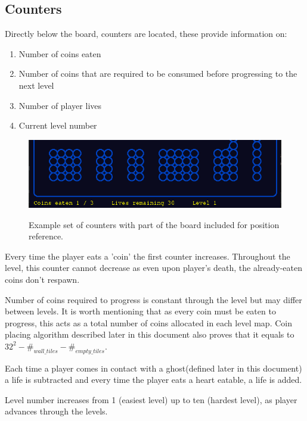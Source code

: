 \documentclass[11pt,a4paper]{report}
\newenvironment{img}{
	\begin{center}
		\begin{figure}
			\begin{center}
			
}{
	\end{center}
		\end{figure}
			\end{center}
}
\begin{document}
			\subsection{Counters}
				Directly below the board, counters are located, these provide information on:
				\begin{enumerate}
					\item
						Number of coins eaten
					\item
						Number of coins that are required to be consumed before progressing to the next level
					\item
						Number of player lives
					\item
						Current level number
				\end{enumerate}
				\begin{img}
					\includegraphics[width=350pt]{images/counter_example}\\
					\caption{Example set of counters with part of the board included for position reference.}
				\end{img}
				Every time the player eats a 'coin' the first counter increases. Throughout the level, this counter cannot decrease as even upon player's death, the already-eaten coins don't respawn.
				
				Number of coins required to progress is constant through the level but may differ between levels. It is worth mentioning that as every coin must be eaten to progress, this acts as a total number of coins allocated in each level map. Coin placing algorithm described later in this document also proves that it equals to $32^2-\#_{wall\_tiles}-\#_{empty\_ tiles}$.
				
				Each time a player comes in contact with a ghost(defined later in this document) a life is subtracted and every time the player eats a heart eatable, a life is added.
				
				Level number increases from 1 (easiest level) up to ten (hardest level), as player advances through the levels.
\end{document}
